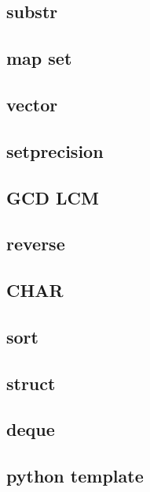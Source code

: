         \subsection{substr}
                
        \subsection{map set}
                
        \subsection{vector}
                
        \subsection{setprecision}
                
        \subsection{GCD LCM}
                
        \subsection{reverse}
                
        \subsection{CHAR}
                
        \subsection{sort}
                
        \subsection{struct}
                
        \subsection{deque}
                
        \subsection{python template}
                    